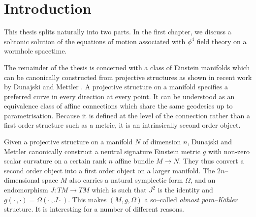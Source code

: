 

\chapter{Introduction}\label{chap:intro}


This thesis splits naturally into two parts. In the first chapter, we discuss a solitonic solution of the equations of motion associated with $\phi^4$ field theory on a wormhole spacetime.  

The remainder of the thesis is concerned with a class of Einstein manifolds which can be canonically constructed from projective structures as shown in recent work by Dunajski and Mettler \cite{DM}. A projective structure on a manifold specifies a preferred curve in every direction at every point. It can be understood as an equivalence class of affine connections which share the same geodesics up to parametrisation. Because it is defined at the level of the connection rather than a first order structure such as a metric, it is an intrinsically second order object.

Given a projective structure on a manifold $N$ of dimension $n$,
Dunajski and Mettler \cite{DM} canonically construct a neutral signature Einstein metric $g$ with non-zero
scalar curvature on a certain rank $n$ affine bundle $M\rightarrow N$. They thus convert a second order object into a first order object on a larger manifold.
The $2n$--dimensional space $M$ also carries a natural symplectic form $\Omega$, and an endomorphism $J:TM\rightarrow TM$ which is such that $J^2$ is the identity and $g(\cdot\,,\cdot)=\Omega(\cdot\,,J\cdot)$. This makes $(M,g,\Omega)$ a so--called \textit{almost para--K\"ahler} structure. It is interesting for a number of different reasons.

